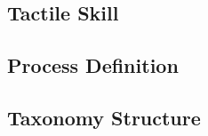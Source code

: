 \subsection{Tactile Skill}\label{ch:foundations:representation:skill}

\subsection{Process Definition}\label{ch:foundations:representation:process}

\subsection{Taxonomy Structure}\label{ch:foundations:representation:taxonomy}

